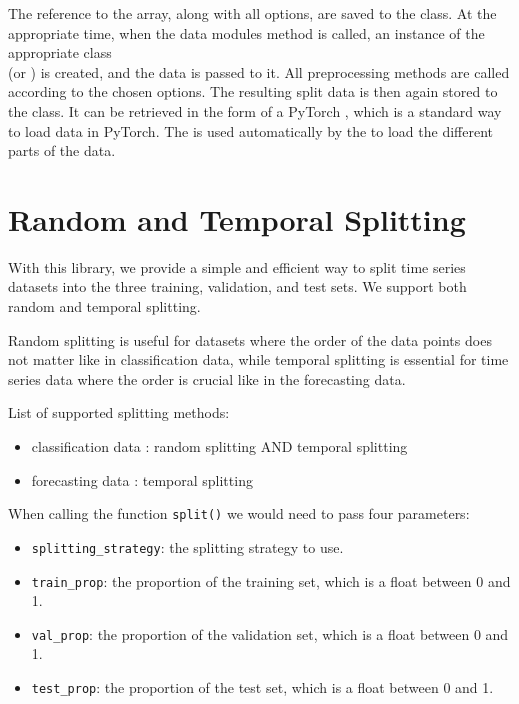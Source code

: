 \documentclass[review]{AIM_report}
\begin{document}
The reference to the \numpy array, along with all options, are saved to the class. At the appropriate time, when the data modules \setup method is called, an instance of the appropriate class\\
(\forecastingDataSet or \classificationDataSet) is created, and the data is passed to it. All preprocessing methods are called according to the chosen options. The resulting split data is then again stored to the \rustDM class. It can be retrieved in the form of a PyTorch \dataLoader, which is a standard way to load data in PyTorch. The \dataLoader is used automatically by the \lightningModule to load the different parts of the data.

\newpage
\section{Random and Temporal Splitting}
With this library, we provide a simple and efficient way to split time series datasets into the three training, validation, and test sets. We support both random and temporal splitting. 

Random splitting is useful for datasets where the order of the data points does not matter like in classification data, while temporal splitting is essential for time series data where the order is crucial like in the forecasting data.

List of supported splitting methods:
\begin{itemize}
    \item classification data : random splitting AND temporal splitting
    \item forecasting data : temporal splitting
\end{itemize}

When calling the function \verb|split()| we would need to pass four parameters:
\begin{itemize}
    \item \verb|splitting_strategy|: the splitting strategy to use.
    \item \verb|train_prop|: the proportion of the training set, which is a float between 0 and 1.
    \item \verb|val_prop|: the proportion of the validation set, which is a float between 0 and 1.
    \item \verb|test_prop|: the proportion of the test set, which is a float between 0 and 1.
\end{itemize}
\end{document}
